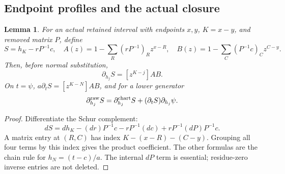 \documentclass[11pt,a4paper]{amsart}
\numberwithin{equation}{section}
\theoremstyle{plain}
\newtheorem{lemma}[theorem]{Lemma}
\theoremstyle{definition}
\begin{document}
\subsection{Endpoint profiles and the actual closure}

\begin{lemma}\label{lem:profile-derivative}
For an actual retained interval with endpoints \(x,y\), \(K=x-y\), and removed matrix \(P\), define
\[
 S=h_K-rP^{-1}c,\quad
 A(z)=1-\sum_R(rP^{-1})_Rz^{x-R},\quad
 B(z)=1-\sum_C(P^{-1}c)_Cz^{C-y}.
\]
Then, before normal substitution,
\[
 \partial_{h_j}S=[z^{K-j}]AB.
\]
On \(t=\psi\), \(a\partial_tS=[z^{K-N}]AB\), and for a lower generator
\[
 \partial_{h_j}^{\rm raw}S
 =\partial_{h_j}^{\rm chart}S+(\partial_tS)\partial_{h_j}\psi.
\]
\end{lemma}
\begin{proof}
Differentiate the Schur complement:
\[
 dS=dh_K-(dr)P^{-1}c-rP^{-1}(dc)+rP^{-1}(dP)P^{-1}c.
\]
A matrix entry at \((R,C)\) has index \(K-(x-R)-(C-y)\).  Grouping all four terms by this index gives the product coefficient.  The other formulas are the chain rule for \(h_N=(t-c)/a\).  The internal \(dP\) term is essential; residue-zero inverse entries are not deleted.
\end{proof}
\end{document}
